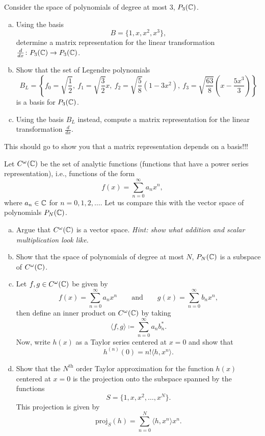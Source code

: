 \documentclass[12pt]{article} %
\begin{document}
\begin{problem}
Consider the space of polynomials of degree at most 3, $P_3(\mathbb{C})$.
\begin{enumerate}[(a)]
    \item Using the basis
    \[
        B = \{ 1, x, x^2, x^3\},
    \]
    determine a matrix representation for the linear transformation $\frac{d}{dx} \colon P_3(\mathbb{C}) \to P_3(\mathbb{C})$.
    \item Show that the set of Legendre polynomials
    \[
        B_L = \left\{f_0 = \sqrt{\frac{1}{2}}, ~ f_1 = \sqrt{\frac{3}{2}}x, ~ f_2 = \sqrt{\frac{5}{8}} (1-3x^2),~ f_3=\sqrt{\frac{63}{8}}\left(x-\frac{5x^3}{3}\right) \right\}
    \]
    is a basis for $P_3(\mathbb{C})$.
    \item Using the basis $B_L$ instead, compute a matrix representation for the linear transformation $\frac{d}{dx}$.
\end{enumerate}
\begin{remark}
    This should go to show you that a matrix representation depends on a basis!!!
\end{remark}
\end{problem}

\begin{problem}
Let $C^\omega(\mathbb{C})$ be the set of analytic functions (functions that have a power series representation), i.e., functions of the form
\[
f(x) = \sum_{n=0}^\infty a_n x^n,
\]
where $a_n\in \mathbb{C}$ for $n=0,1,2,\dots$. Let us compare this with the vector space of polynomials $P_N(\mathbb{C})$.
\begin{enumerate}[(a)]
    \item Argue that $C^\omega(\mathbb{C})$ is a vector space. \emph{Hint: show what addition and scalar multiplication look like.}
    \item Show that the space of polynomials of degree at most $N$, $P_N(\mathbb{C})$ is a subspace of $C^\omega(\mathbb{C})$.
    \item Let $f,g\in C^\omega(\mathbb{C})$ be given by
    \[
        f(x)=\sum_{n=0}^\infty a_n x^n \qquad \textrm{and} \qquad g(x) = \sum_{n=0}^\infty b_n x^n,
    \]
    then define an inner product on $C^\omega(\mathbb{C})$ by taking
    \[
    \langle f,g\rangle \coloneqq \sum_{n=0}^\infty a_n b_n^*.
    \]
    Now, write $h(x)$ as a Taylor series centered at $x=0$ and show that
    \[
    h^{(n)}(0) = n!\langle h,x^n \rangle.
    \]
    \item Show that the $N^\textrm{th}$ order Taylor approximation for the function $h(x)$ centered at $x=0$ is the projection onto the subspace spanned by the functions
    \[
    S=\{1,x,x^2,\dots,x^N\}.
    \]
    This projection is given by
    \[
    \textrm{proj}_S(h) = \sum_{n=0}^N \langle h, x^n \rangle x^n.
    \]
\end{enumerate}
\end{problem}
\end{document}
